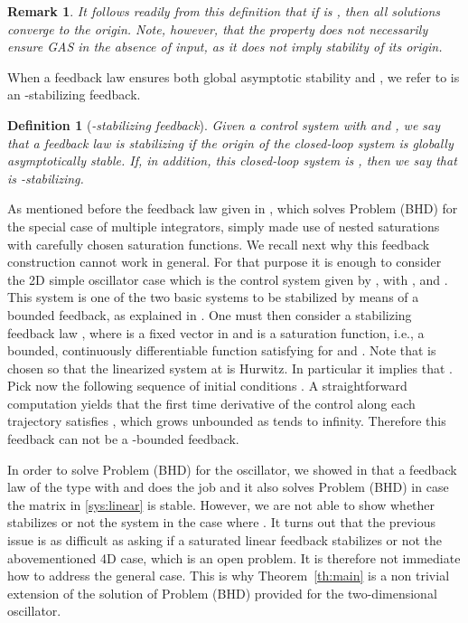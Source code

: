 \documentclass[letterpaper, 10pt]{article}
\newtheorem{defi}{Definition}
\newtheorem{remark}{Remark}
\begin{document}
 \begin{remark}\label{rem1}
It follows readily from this definition that if  is , then all solutions  converge to the origin. Note, however, that the  property does not necessarily ensure GAS in the absence of input, as it does not imply stability of its origin.
\end{remark}

When a feedback law ensures both global asymptotic stability and , we refer to is an -stabilizing feedback.

\begin{defi}[\emph{-stabilizing feedback}]\label{def:sissfeedback}
Given a control system  with  and , we say that a feedback law  is \emph{stabilizing} if the origin of the closed-loop system  is globally asymptotically stable. If, in addition, this closed-loop system is , then we say that  is \emph{ -stabilizing}.
\end{defi}




As mentioned before the feedback law given in  \cite{LCC1}, which solves Problem (BHD) for the special case of multiple integrators, simply made use of nested saturations with carefully chosen saturation functions. We recall next why this feedback construction cannot work in general. For that purpose it is enough to consider the 2D simple oscillator case which is the control system given by , with ,  and . This system is one of the two basic systems to be stabilized by means of a bounded feedback, as explained in \cite{SSY}. One must then consider a stabilizing feedback law , where  is a fixed vector in  and  is a saturation function, i.e., a bounded, continuously differentiable function satisfying  for  and . Note that  is chosen so that the linearized system at  is Hurwitz. In particular it implies that . Pick now the following sequence of initial conditions . A straightforward computation yields that the first time derivative of the control along each trajectory satisfies , which grows unbounded as  tends to infinity. Therefore this feedback can not be a -bounded feedback.

In order to solve Problem (BHD) for the  oscillator, we showed in \cite{LCC1} that a feedback law of the type  with  and  does the job and it also solves Problem (BHD) in case the matrix  in \eqref{sys:linear} is stable. However, we are not able to show whether  stabilizes or not the system in the case where . It turns out that the previous issue is as difficult as asking if a saturated linear feedback stabilizes or not the abovementioned 4D case, which is an open problem.  It is therefore not immediate how to address the general case. This is why Theorem~\ref{th:main} is a non trivial extension of the solution of Problem (BHD) provided for the two-dimensional oscillator.
\end{document}
